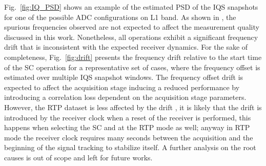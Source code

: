 \documentclass{IEEEtaes}
\begin{document}
Fig.~\ref{fig:IQ_PSD} shows an example of the estimated \gls{PSD} of the \gls{IQS} snapshots for one of the possible \gls{ADC} configurations on L1 band. As shown in \cite{JournalDiMissione}, the spurious frequencies observed are not expected to affect the measurement quality discussed in this work. Nonetheless, all operations exhibit a significant frequency drift that is inconsistent with the expected receiver dynamics.
For the sake of completeness, Fig.~\ref{fig:drift} presents the frequency drift relative to the start time of the \gls{SC} operation for a representative set of cases, where the frequency offset is estimated over multiple \gls{IQS} snapshot windows. %
The frequency offset drift is expected to affect the acquisition stage inducing a reduced performance by introducing a correlation loss dependent on the acquisition stage parameters. However, the \gls{RTP} dataset is less affected by the drift \cite{JournalDiMissione}, it is likely that the drift is introduced by the receiver clock when a reset of the receiver is performed, this happens when selecting the \gls{SC} and at the \gls{RTP} mode as well; anyway in \gls{RTP} mode the receiver clock requires many seconds between the acquisition and the beginning of the signal tracking to stabilize itself.
A further analysis on the root causes is out of scope and left for future works.
\end{document}
